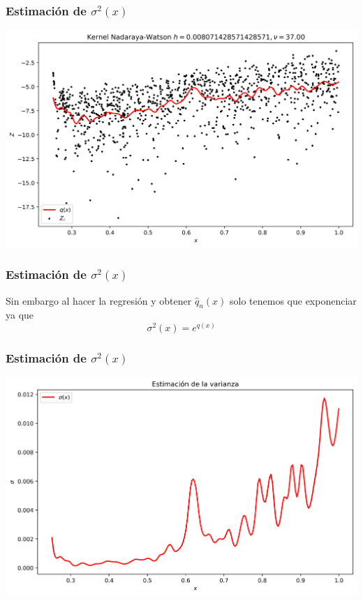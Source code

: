 \documentclass[aspectratio=169,spanish]{beamer}
\begin{document}
\begin{frame}
\frametitle{Estimación de $\sigma^{2}(x)$}
\center
\includegraphics[scale=0.5]{var2}
\end{frame}


\begin{frame}
\frametitle{Estimación de $\sigma^{2}(x)$}
Sin embargo al hacer la regresión y obtener $\hat{q}_n(x)$ solo tenemos que exponenciar ya que $$\sigma^2(x)=e^{q(x)}$$
\end{frame}

\begin{frame}
\frametitle{Estimación de $\sigma^{2}(x)$}
\center
\includegraphics[scale=0.5]{var3}
\end{frame}
\end{document}
